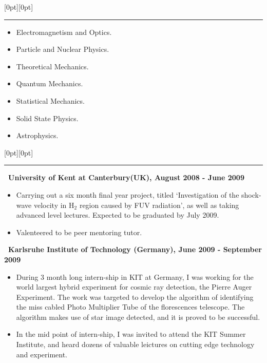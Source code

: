 \documentclass[a4paper,12pt]{letter}
\begin{document}
\raisebox{0pt}[0pt][0pt]{\Large\textbf{\raisebox{-3.5ex}{Training in Physics}}} 

\rule[-0.5cm]{10cm}{1pt}
\begin{itemize}
\item \textrm{\normalsize Electromagnetism and Optics.}
\item \textrm{\normalsize Particle and Nuclear Physics.}
\item \textrm{\normalsize Theoretical Mechanics.}
\item \textrm{\normalsize Quantum Mechanics.}
\item \textrm{\normalsize Statistical Mechanics.}
\item \textrm{\normalsize Solid State Physics.}
\item \textrm{\normalsize Astrophysics.}
\end{itemize}

\raisebox{0pt}[0pt][0pt]{\Large\textbf{\raisebox{-3.5ex}{History of Study}}} 

\rule[-0.5cm]{10cm}{1pt}

\vspace{2mm}
\textbf{\normalsize ~University of Kent at Canterbury(UK), August 2008 - June 2009}
\begin{itemize}
\item \textrm{\normalsize Carrying out a six month final year project, titled \lq Investigation of the shock-wave velocity in H$_2$ region caused by FUV radiation\rq, as well as taking advanced level lectures. Expected to be graduated by July 2009.} 
\item \textrm{\normalsize Valenteered to be peer mentoring tutor.}

\end{itemize}

\textbf{\normalsize ~Karlsruhe Institute of Technology (Germany), June 2009 - September 2009}
\begin{itemize}
\item \textrm{\normalsize During 3 month long intern-ship in KIT at Germany, I was working for the world largest hybrid experiment for cosmic ray detection, the Pierre Auger Experiment. The work was targeted to develop the algorithm of identifying the miss cabled Photo Multiplier Tube of the florescences telescope. The algorithm makes use of star image detected, and it is proved to be successful.}
\item \textrm{\normalsize In the mid point of intern-ship, I was invited to attend the KIT Summer Institute, and heard dozens of valuable leictures on cutting edge technology and experiment.}
\end{itemize}
\end{document}
